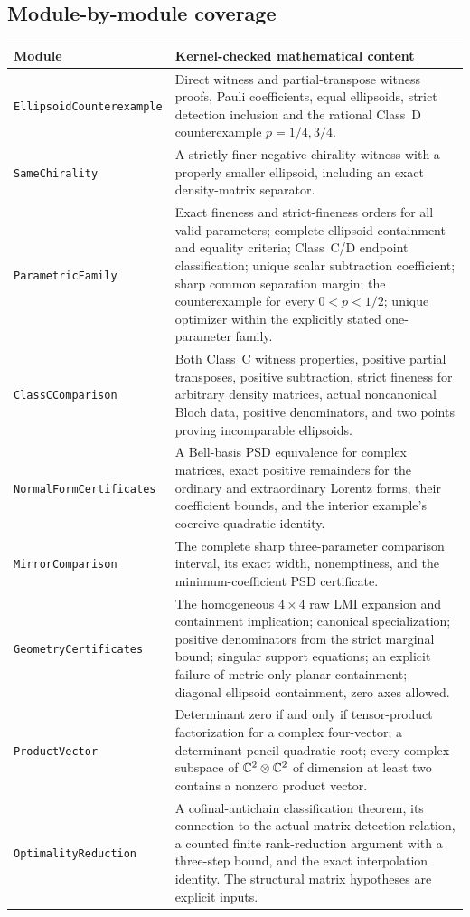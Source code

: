\subsection{Module-by-module coverage}

\begin{longtable}{@{}p{.30\linewidth}p{.65\linewidth}@{}}
\toprule
Module & Kernel-checked mathematical content\\
\midrule\endhead
\texttt{EllipsoidCounterexample} & Direct witness and partial-transpose witness proofs, Pauli coefficients, equal ellipsoids, strict detection inclusion and the rational Class~D counterexample $p=1/4,3/4$.\\[4pt]
\texttt{SameChirality} & A strictly finer negative-chirality witness with a properly smaller ellipsoid, including an exact density-matrix separator.\\[4pt]
\texttt{ParametricFamily} & Exact fineness and strict-fineness orders for all valid parameters; complete ellipsoid containment and equality criteria; Class~C/D endpoint classification; unique scalar subtraction coefficient; sharp common separation margin; the counterexample for every $0<p<1/2$; unique optimizer within the explicitly stated one-parameter family.\\[4pt]
\texttt{ClassCComparison} & Both Class~C witness properties, positive partial transposes, positive subtraction, strict fineness for arbitrary density matrices, actual noncanonical Bloch data, positive denominators, and two points proving incomparable ellipsoids.\\[4pt]
\texttt{NormalFormCertificates} & A Bell-basis PSD equivalence for complex matrices, exact positive remainders for the ordinary and extraordinary Lorentz forms, their coefficient bounds, and the interior example's coercive quadratic identity.\\[4pt]
\texttt{MirrorComparison} & The complete sharp three-parameter comparison interval, its exact width, nonemptiness, and the minimum-coefficient PSD certificate.\\[4pt]
\texttt{GeometryCertificates} & The homogeneous $4\times4$ raw LMI expansion and containment implication; canonical specialization; positive denominators from the strict marginal bound; singular support equations; an explicit failure of metric-only planar containment; diagonal ellipsoid containment, zero axes allowed.\\[4pt]
\texttt{ProductVector} & Determinant zero if and only if tensor-product factorization for a complex four-vector; a determinant-pencil quadratic root; every complex subspace of $\mathbb C^2\otimes\mathbb C^2$ of dimension at least two contains a nonzero product vector.\\[4pt]
\texttt{OptimalityReduction} & A cofinal-antichain classification theorem, its connection to the actual matrix detection relation, a counted finite rank-reduction argument with a three-step bound, and the exact interpolation identity. The structural matrix hypotheses are explicit inputs.\\
\bottomrule
\end{longtable}

